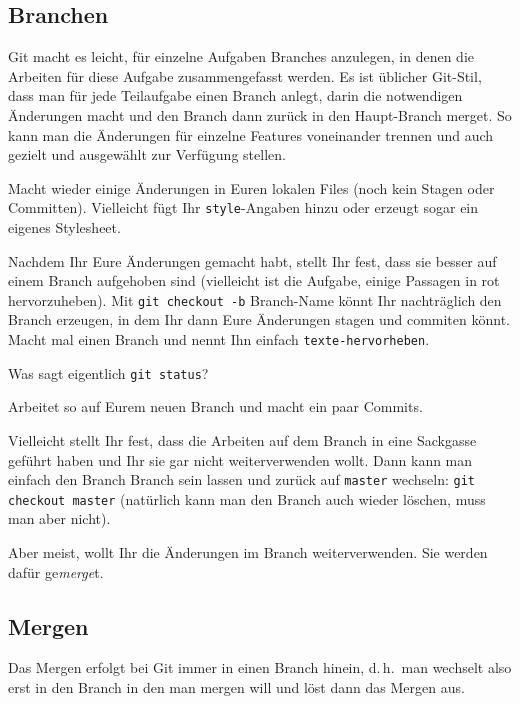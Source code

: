 \documentclass[a4paper, 12pt]{article}
\newcounter{enumisave}
\newenvironment{enumerate*}%
{\begin{enumerate}\setcounter{enumi}{\theenumisave}}%
{\setcounter{enumisave}{\theenumi}\end{enumerate}}
\begin{document}
\subsection*{Branchen}\vspace{-1.5ex}
Git macht es leicht, für einzelne Aufgaben Branches anzulegen, in denen die Arbeiten für diese Aufgabe zusammengefasst werden. Es ist üblicher Git-Stil, dass man für jede Teilaufgabe einen Branch anlegt, darin die notwendigen Änderungen macht und den Branch dann zurück in den Haupt-Branch merget. So kann man die Änderungen für einzelne Features voneinander trennen und auch gezielt und ausgewählt zur Verfügung stellen.
\begin{enumerate*}
\item Macht wieder einige Änderungen in Euren lokalen Files (noch kein Stagen oder Committen). Vielleicht fügt Ihr \texttt{style}-Angaben hinzu oder erzeugt sogar ein eigenes Stylesheet.

Nachdem Ihr Eure Änderungen gemacht habt, stellt Ihr fest, dass sie besser auf einem Branch aufgehoben sind (vielleicht ist die Aufgabe, einige Passagen in rot hervorzuheben).
Mit \texttt{git checkout -b} \textsf{Branch-Name} könnt Ihr nachträglich den
Branch erzeugen, in dem Ihr dann Eure Änderungen stagen und commiten könnt. 
Macht mal einen Branch und nennt Ihn einfach \texttt{texte-hervorheben}.

Was sagt eigentlich \texttt{git status}?
\item Arbeitet so auf Eurem neuen Branch und macht ein paar Commits.
\end{enumerate*}

Vielleicht stellt Ihr fest, dass die Arbeiten auf dem Branch in eine Sackgasse geführt haben und Ihr sie gar nicht weiterverwenden wollt. Dann kann man einfach den Branch Branch sein lassen und zurück auf \texttt{master} wechseln: \texttt{git checkout master} (natürlich kann man den Branch auch wieder löschen, muss man aber nicht). 

Aber meist, wollt Ihr die Änderungen im Branch weiterverwenden. Sie werden dafür ge\emph{merge}\/t. 

\subsection*{Mergen}\vspace{-1.5ex}
Das Mergen erfolgt bei Git immer in einen Branch hinein, d.\,h.\ man wechselt also erst in den Branch in den man mergen will und löst dann das Mergen aus.
\end{document}
